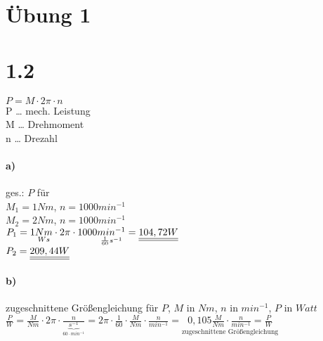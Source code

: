 







\maketitle
\newpage
\tableofcontents
\newpage


\section{Übung 1}

\section*{1.2}

$\boxed{P=M\cdot 2\pi \cdot n}$\\
P … mech. Leistung\\
M … Drehmoment\\
n … Drezahl
\paragraph{a)} ges.: $P$ für\\
$M_1= 1Nm$, $n=1000 min^{-1}$\\
$M_2= 2Nm$, $n=1000 min^{-1}$\vspace*{1em}\\
$P_1=1\underset{Ws}{Nm} \cdot 2\pi \cdot 1000 \underset{\frac{1}{60}s^{-1}}{min^{-1}}=\underline{\underline{104,72W}}$\\
$P_2=\underline{\underline{209,44W}}$

\paragraph{b)} zugeschnittene Größengleichung für $P$, $M$ in $Nm$, $n$ in $min^{-1}$, $P$ in $Watt$\\
$\frac{P}{W}=\frac{M}{Nm} \cdot 2 \pi \cdot \frac{n}{\underbrace{s^{-1}}_{60\cdot min^{-1}}}=2\pi \cdot \frac{1}{60} \cdot \frac{M}{Nm} \cdot \frac{n}{min^{-1}}=\underset{\text{zugeschnittene Größengleichung}}{\boxed{0,105\frac{M}{Nm}\cdot \frac{n}{min^{-1}}=\frac{P}{W}}}$

